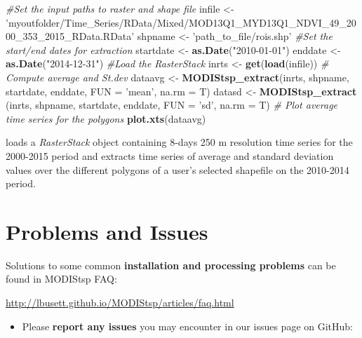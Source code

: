 \documentclass[]{article}
\newenvironment{Shaded}{\begin{snugshade}}{\end{snugshade}}
\newcommand{\KeywordTok}[1]{\textcolor[rgb]{0.13,0.29,0.53}{\textbf{#1}}}
\newcommand{\DataTypeTok}[1]{\textcolor[rgb]{0.13,0.29,0.53}{#1}}
\newcommand{\StringTok}[1]{\textcolor[rgb]{0.31,0.60,0.02}{#1}}
\newcommand{\CommentTok}[1]{\textcolor[rgb]{0.56,0.35,0.01}{\textit{#1}}}
\newcommand{\NormalTok}[1]{#1}
\providecommand{\tightlist}{%
  \setlength{\itemsep}{0pt}\setlength{\parskip}{0pt}}
\begin{document}
\begin{Shaded}
\begin{Highlighting}[]
  \CommentTok{#Set the input paths to raster and shape file}
\NormalTok{  infile    <-}\StringTok{ 'myoutfolder/Time_Series/RData/Mixed/MOD13Q1_MYD13Q1_NDVI_49_2000_353_2015_RData.RData'}  
\NormalTok{  shpname   <-}\StringTok{ 'path_to_file/rois.shp'}  
  \CommentTok{#Set the start/end dates for extraction}
\NormalTok{  startdate <-}\StringTok{ }\KeywordTok{as.Date}\NormalTok{(}\StringTok{"2010-01-01"}\NormalTok{)  }
\NormalTok{  enddate   <-}\StringTok{ }\KeywordTok{as.Date}\NormalTok{(}\StringTok{"2014-12-31"}\NormalTok{)    }
  \CommentTok{#Load the RasterStack}
\NormalTok{  inrts     <-}\StringTok{ }\KeywordTok{get}\NormalTok{(}\KeywordTok{load}\NormalTok{(infile)) }
  \CommentTok{# Compute average and St.dev}
\NormalTok{  dataavg   <-}\StringTok{ }\KeywordTok{MODIStsp_extract}\NormalTok{(inrts, shpname, startdate, enddate, }\DataTypeTok{FUN =} \StringTok{'mean'}\NormalTok{, }\DataTypeTok{na.rm =}\NormalTok{ T)}
\NormalTok{  datasd    <-}\StringTok{ }\KeywordTok{MODIStsp_extract}\NormalTok{ (inrts, shpname, startdate, enddate, }\DataTypeTok{FUN =} \StringTok{'sd'}\NormalTok{, }\DataTypeTok{na.rm =}\NormalTok{ T)}
  \CommentTok{# Plot average time series for the polygons}
  \KeywordTok{plot.xts}\NormalTok{(dataavg) }
\end{Highlighting}
\end{Shaded}

loads a \emph{RasterStack} object containing 8-days 250 m resolution
time series for the 2000-2015 period and extracts time series of average
and standard deviation values over the different polygons of a user's
selected shapefile on the 2010-2014 period.

\section{Problems and Issues}\label{problems-and-issues}

Solutions to some common \textbf{installation and processing problems}
can be found in MODIStsp FAQ:

\url{http://lbusett.github.io/MODIStsp/articles/faq.html}

\begin{itemize}
\tightlist
\item
  Please \textbf{report any issues} you may encounter in our issues page
  on GitHub:
\end{itemize}
\end{document}
